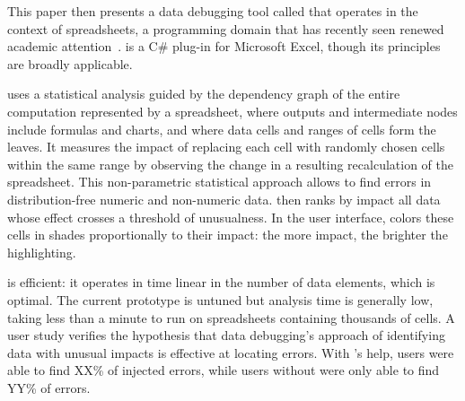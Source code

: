 This paper then presents a data debugging tool called \checkcell{}
that operates in the context of spreadsheets, a programming domain
that has recently seen renewed academic
attention~\cite{DBLP:conf/popl/Gulwani11,DBLP:conf/pldi/HarrisG11,Singh:2012:LSS:2212351.2212356}. \checkcell{}
is a C\# plug-in for Microsoft Excel, though its principles are
broadly applicable. 

\checkcell{} uses a statistical analysis guided by the dependency graph 
of the entire computation represented by a spreadsheet, where outputs
and intermediate nodes include formulas and charts, and where data
cells and ranges of cells form the leaves. It measures the impact of
replacing each cell with randomly chosen cells within the same range
by observing the change in a resulting recalculation of the
spreadsheet. This non-parametric statistical approach
allows \checkcell{} to find errors in distribution-free numeric and
non-numeric data. \checkcell{} then ranks by impact all data whose
effect crosses a threshold of unusualness. In the user
interface, \checkcell{} colors these cells in shades proportionally to
their impact: the more impact, the brighter the highlighting.

\checkcell{} is efficient: it operates in time linear in the number
of data elements, which is optimal. The current prototype is untuned
but analysis time is generally low, taking less than a minute to run
on spreadsheets containing thousands of cells. A user study verifies
the hypothesis that data debugging's approach of identifying data with
unusual impacts is effective at locating errors. With \checkcell{}'s
help, users were able to find XX\% of injected errors, while users
without \checkcell{} were only able to find YY\% of errors.

